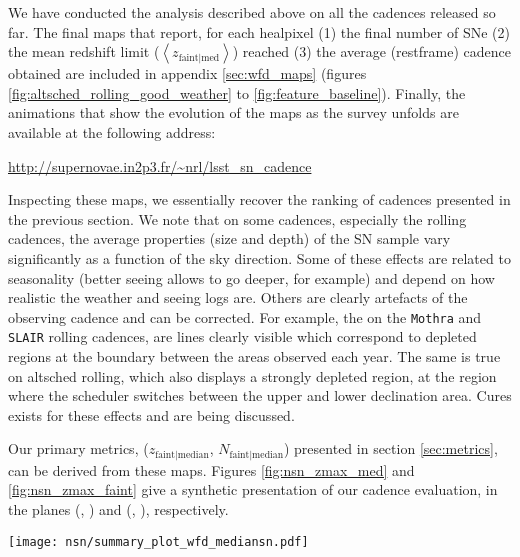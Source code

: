 We have conducted the analysis described above on all the cadences released
so far.  The final maps that report, for each healpixel (1) the final
number of SNe (2) the mean redshift limit
($\left<z_{\mathrm{faint|med}}\right>$) reached (3) the average
(restframe) cadence obtained are included in appendix
\ref{sec:wfd_maps} (figures \ref{fig:altsched_rolling_good_weather} to
\ref{fig:feature_baseline}). Finally, the animations that show the evolution
of the maps as the survey unfolds are available at the following address:
\begin{center}
  \href{http://supernovae.in2p3.fr/~nrl/lsst_sn_cadence}{http://supernovae.in2p3.fr/\~{}nrl/lsst\_sn\_cadence}
\end{center}
Inspecting these maps, we essentially recover the ranking of cadences
presented in the previous section.  We note that on some cadences,
especially the rolling cadences, the average properties (size and
depth) of the SN sample vary significantly as a function of the sky
direction. Some of these effects are related to seasonality (better
seeing allows to go deeper, for example) and depend on how realistic
the \opsim weather and seeing logs are. Others are clearly artefacts
of the observing cadence and can be corrected. For example, the on the
{\tt Mothra} and {\tt SLAIR} rolling cadences, are lines clearly
visible which correspond to depleted regions at the boundary between
the areas observed each year. The same is true on altsched rolling,
which also displays a strongly depleted region, at the region where
the scheduler switches between the upper and lower declination area.
Cures exists for these effects and are being discussed. 

Our primary metrics, ($z_{\mathrm{faint|median}}$, $N_{\mathrm{faint|median}}$) 
presented in section \ref{sec:metrics}, can be derived from these
maps.  Figures \ref{fig:nsn_zmax_med} and \ref{fig:nsn_zmax_faint}
give a synthetic presentation of our cadence evaluation, in the planes
(\zfaint, \nsnfaint) and (\zmed, \nsnmed), respectively.

\begin{sidewaysfigure}
  \begin{center}
    \texttt{[image: nsn/summary\_plot\_wfd\_mediansn.pdf]}
    \caption{Representation of the cadences analyzed in this study in
      the plane (\zmed, \nsnmed). This gives an assessement, for each
      cadence, of (1) the sample depth, i.e. at which redshift the
      median SN no longer passes the requirements listed in section
      \ref{sec:sn_sampling_requirements} and (2) the size of the
      subset of well-sampled SNe~Ia.}
    \label{fig:nsn_zmax_med}
  \end{center}
\end{sidewaysfigure}

